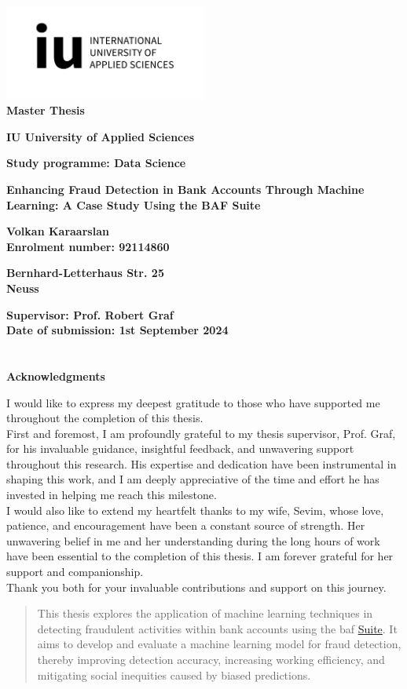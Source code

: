 \documentclass[12pt,a4paper]{report}
\renewcommand{\maketitle}{
    \begin{titlepage}
       \noindent
        \vspace*{1cm}
        \begin{center}
            \includegraphics[width=0.5\textwidth]{iu_Logo_EN_black_RGB_horizontal.jpg}\\[0.5cm]
    
            \textbf{\fontsize{14pt}{16pt}\selectfont Master Thesis}
            \vspace{1.5cm}
    
            \textbf{\fontsize{14pt}{16pt}\selectfont IU University of Applied Sciences}
            \vspace{0.5cm}
    
            \textbf{\fontsize{14pt}{16pt}\selectfont Study programme: Data Science}
            \vspace{2.0cm}
    
            \textbf{\fontsize{14pt}{16pt}\selectfont Enhancing Fraud Detection in Bank Accounts Through Machine Learning: A Case Study Using the BAF Suite}
            
            \vspace{2.0cm}
            \textbf{\fontsize{14pt}{16pt}\selectfont Volkan Karaarslan}\\
            \vspace{0.5cm}
            \textbf{\fontsize{14pt}{16pt}\selectfont Enrolment number: 92114860}\\
            
            \vspace{0.5cm}
            
            \textbf{\fontsize{14pt}{16pt}\selectfont Bernhard-Letterhaus Str. 25}\\
            \vspace{0.5cm}
            \textbf{\fontsize{14pt}{16pt}\selectfont 41466 Neuss}
            
        \end{center}
        
        \vspace*{\fill}
        \noindent
        \textbf{\fontsize{14pt}{16pt}\selectfont Supervisor: Prof. Robert Graf}\\
        \textbf{\fontsize{14pt}{16pt}\selectfont Date of submission: 1st September 2024}
    \end{titlepage}
}
\begin{document}
\maketitle



\chapter*{} %
\vfill
\begin{center}
    \textbf{\large Acknowledgments}
\end{center}

\vspace{1cm} %

I would like to express my deepest gratitude to those who have supported me throughout the completion of this thesis.\\

First and foremost, I am profoundly grateful to my thesis supervisor, Prof. Graf, for his invaluable guidance, insightful feedback, and unwavering support throughout this research. His expertise and dedication have been instrumental in shaping this work, and I am deeply appreciative of the time and effort he has invested in helping me reach this milestone.\\

I would also like to extend my heartfelt thanks to my wife, Sevim, whose love, patience, and encouragement have been a constant source of strength. Her unwavering belief in me and her understanding during the long hours of work have been essential to the completion of this thesis. I am forever grateful for her support and companionship.\\

Thank you both for your invaluable contributions and support on this journey.

\vfill %
\newpage %


\begin{abstract}
This thesis explores the application of machine learning techniques in detecting fraudulent activities within bank accounts using the \acrshort{baf} \href{https://www.kaggle.com/datasets/sgpjesus/bank-account-fraud-dataset-neurips-2022/code}{Suite}. It aims to develop and evaluate a machine learning model for fraud detection, thereby improving detection accuracy, increasing working efficiency, and mitigating social inequities caused by biased predictions.
\end{abstract}
\end{document}
